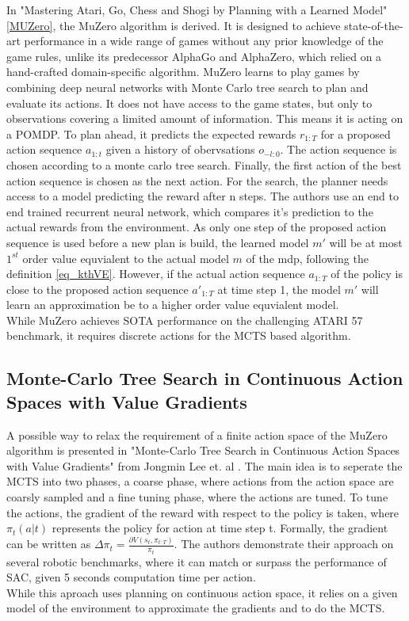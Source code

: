 In "Mastering Atari, Go, Chess and Shogi by Planning with a
Learned Model" \ref{MUZero}, the MuZero algorithm is derived. It is designed to achieve state-of-the-art performance 
in a wide range of games without any prior knowledge of the game rules, unlike its predecessor AlphaGo and AlphaZero, which relied on a hand-crafted 
domain-specific algorithm. MuZero learns to play games by combining deep neural networks with Monte Carlo tree search to plan and evaluate its actions. 
It does not have access to the game states, but only to observations covering a limited amount of information. This means it is acting on a POMDP.
To plan ahead, it predicts the expected rewards $r_{1:T}$ for a proposed action sequence $a_{1:t}$ given a history of obervsations $o_{-l:0}$. The action 
sequence is chosen according to a monte carlo tree search. Finally, the first action of the best action sequence is chosen as the next action. 
For the search, the planner needs access to a model predicting the reward after n steps. The authors use an end to end trained recurrent neural network, which 
compares it's prediction to the actual rewards from the environment. As only one step of the proposed action sequence is used before a new plan is build, the 
learned model $m'$ will be at most $1^{st}$ order value equvialent to the actual model $m$ of the mdp, following the definition \ref{eq_kthVE}. However, if 
the actual action sequence $a_{1:T}$ of the policy is close to the proposed action sequence $a'_{1:T}$ at time step 1, the model $m'$ will learn an approximation 
be to a higher order value equvialent model.\\ 
While MuZero achieves SOTA performance on the challenging ATARI 57 benchmark, it requires discrete actions for the MCTS based algorithm.

\subsection{Monte-Carlo Tree Search in Continuous Action Spaces with Value Gradients}
A possible way to relax the requirement of a finite action space of the MuZero algorithm is presented in 
"Monte-Carlo Tree Search in Continuous Action Spaces with Value Gradients" from Jongmin Lee et. al \cite{Lee_Jeon_Kim_Kim_2020}. The main idea is to seperate 
the MCTS into two phases, a coarse phase, where actions from the action space are coarsly sampled and a fine tuning phase, where the actions are tuned. 
To tune the actions, the gradient of the reward with respect to the policy is taken, where $\pi_t(a|t)$ represents the policy for action at time step t. 
Formally, the gradient can be written as $\Delta \pi_t = \frac{\partial V (s_t, \pi_{t:T})}{\pi_{t}}$. The authors demonstrate their approach on several robotic 
benchmarks, where it can match or surpass the performance of SAC, given 5 seconds computation time per action.\\
While this aproach uses planning on continuous action space, it relies on a given model of the environment to approximate the gradients and to do the MCTS.